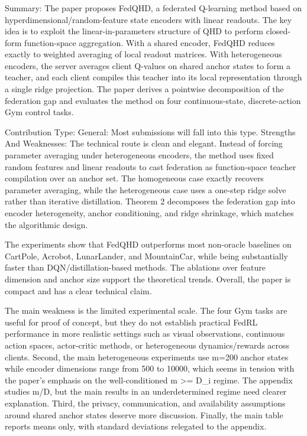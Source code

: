 \subsubsection{}
Summary:
The paper proposes FedQHD, a federated Q-learning method based on hyperdimensional/random-feature state encoders with linear readouts. The key idea is to exploit the linear-in-parameters structure of QHD to perform closed-form function-space aggregation. With a shared encoder, FedQHD reduces exactly to weighted averaging of local readout matrices. With heterogeneous encoders, the server averages client Q-values on shared anchor states to form a teacher, and each client compiles this teacher into its local representation through a single ridge projection. The paper derives a pointwise decomposition of the federation gap and evaluates the method on four continuous-state, discrete-action Gym control tasks.

Contribution Type: General: Most submissions will fall into this type.
Strengths And Weaknesses:
The technical route is clean and elegant. Instead of forcing parameter averaging under heterogeneous encoders, the method uses fixed random features and linear readouts to cast federation as function-space teacher compilation over an anchor set. The homogeneous case exactly recovers parameter averaging, while the heterogeneous case uses a one-step ridge solve rather than iterative distillation. Theorem 2 decomposes the federation gap into encoder heterogeneity, anchor conditioning, and ridge shrinkage, which matches the algorithmic design.

The experiments show that FedQHD outperforms most non-oracle baselines on CartPole, Acrobot, LunarLander, and MountainCar, while being substantially faster than DQN/distillation-based methods. The ablations over feature dimension and anchor size support the theoretical trends. Overall, the paper is compact and has a clear technical claim.

The main weakness is the limited experimental scale. The four Gym tasks are useful for proof of concept, but they do not establish practical FedRL performance in more realistic settings such as visual observations, continuous action spaces, actor-critic methods, or heterogeneous dynamics/rewards across clients. Second, the main heterogeneous experiments use m=200 anchor states while encoder dimensions range from 500 to 10000, which seems in tension with the paper's emphasis on the well-conditioned m >= D_i regime. The appendix studies m/D, but the main results in an underdetermined regime need clearer explanation. Third, the privacy, communication, and availability assumptions around shared anchor states deserve more discussion. Finally, the main table reports means only, with standard deviations relegated to the appendix.

